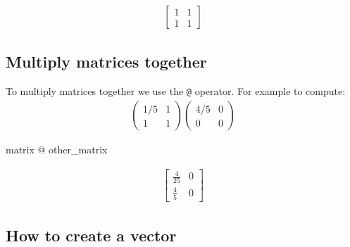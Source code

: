 \begin{equation*}
\begin{split}\displaystyle \left[\begin{matrix}1 & 1\\1 & 1\end{matrix}\right]\end{split}
\end{equation*}




\subsection{Multiply matrices together}
\label{\detokenize{tools-for-mathematics/04-matrices/how/main:multiply-matrices-together}}

To multiply matrices together we use the \texttt{@} operator. For example to compute:
\begin{equation*}
\begin{split}
    \begin{pmatrix}
        1 / 5 & 1\\
        1 & 1
    \end{pmatrix}
    \begin{pmatrix}
        4 / 5 & 0\\
        0 & 0
    \end{pmatrix}
\end{split}
\end{equation*}



\begin{pyin}
matrix @ other_matrix
\end{pyin}




\begin{equation*}
\begin{split}\displaystyle \left[\begin{matrix}\frac{4}{25} & 0\\\frac{4}{5} & 0\end{matrix}\right]\end{split}
\end{equation*}




\subsection{How to create a vector}
\label{\detokenize{tools-for-mathematics/04-matrices/how/main:how-to-create-a-vector}}

